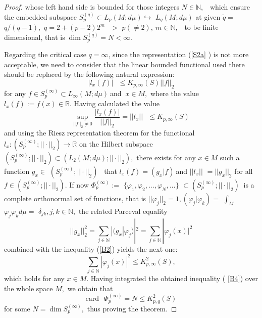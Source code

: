 \documentclass[pdflatex,sn-mathphys-num]{sn-jnl}%
\theoremstyle{thmstyleone}%
\theoremstyle{thmstyletwo}%
\theoremstyle{thmstylethree}%
\begin{document}
\begin{proof}
	whose left hand side is bounded for those integers $N\in \mathbb{N},$ \
	which ensure the embedded subspace $S_{p}^{(q)}\subset L_{p}(M;d\mu
	)\hookrightarrow $ $L_{q}(M;d\mu ) $ at given $\tilde{q}=$ $q/(q-1),$  
	$q=2+(p-2)2^{m}\ $\ $>$ $p(\neq 2),\ m\in \mathbb{N},$ \ to be finite
	dimensional, that is $\ \mathrm{dim}$ $S_{p}^{(q)}=N<\infty .$
	
	Regarding the critical case $q=\infty $, since the representation (\ref{S2a}%
	) is not more acceptable, we need to consider that the linear bounded
	functional used there should be replaced by the following natural
	expression: 
	\begin{equation}
		|l_{x}(f)|\text{ }\leq K_{p,\infty }(S)||f||_{2}  \label{B1}
	\end{equation}%
	for any $f\in S_{p}^{(\infty )}\subset L_{\infty }(M;d\mu )\ $and $\ x\in M,$
	where the value $l_{x}(f):=f(x)\in \mathbb{R}.$ Having calculated the value%
	\begin{equation}
		\sup_{||f||_{2}\neq 0}\frac{|l_{x}(f)|}{||f||_{2}}=||l_{x}||\text{ }\leq
		K_{p,\infty }(S)\   \label{B2}
	\end{equation}%
	and using the Riesz representation theorem for the functional $%
	l_{x}:(S_{p}^{(\infty )};||\cdot ||_{2})\rightarrow \mathbb{R}$ on the
	Hilbert subspace $(S_{p}^{(\infty )};||\cdot ||_{2})\subset (L_{2}(M;d\mu
	);||\cdot ||_{2}),$ there exists for any $x\in M$ such a function $g_{x}\in $
	$(S_{p}^{(\infty )};||\cdot ||_{2})$ \ that $l_{x}(f)=(g_{x}|f)\ $and $%
	||l_{x}||$ $=||g_{x}||_{2}$ for all $f\in (S_{p}^{(\infty )};||\cdot
	||_{2}). $ If now $\Phi _{p}^{(\infty )}:=$ $\{\varphi _{1},\varphi
	_{2},...,\varphi _{N},...\}$ $\subset (S_{p}^{(\infty )};||\cdot ||_{2})\ $
	is a complete orthonormal set of functions, that is $||\varphi
	_{j}||_{2}=1,(\varphi _{j}|\varphi _{k})=$ $\int_{M}$ $\varphi _{j}\varphi
	_{k}d\mu =$ $\delta _{jk},j,k\in \mathbb{N},$ the related Parceval equality 
	\begin{equation}
		||g_{x}||_{2}^{2}=\sum_{j\in \mathbb{N}}|(g_{x}|\varphi
		_{j})|^{2}=\sum_{j\in \mathbb{N}}|\varphi _{j}(x)|^{2}  \label{B3}
	\end{equation}%
	combined with the inequality (\ref{B2}) yields the next one: 
	\begin{equation}
		\sum_{j\in \mathbb{N}}|\varphi _{j}(x)|^{2}\leq K_{p,\infty }^{2}(S),
		\label{B4}
	\end{equation}%
	which holds for any $x\in M.$ Having integrated the obtained inequality 
	( \ref{B4}) over the whole space $M,$ we obtain that 
	\begin{equation}
		\mathrm{card}\text{ }\Phi _{p}^{(\infty )}=N\leq K_{p,q}^{2}(S)  \label{B5}
	\end{equation}%
	for some $N=\dim S_{p}^{(\infty )},$ thus proving the theorem. %
\end{proof}
\end{document}
